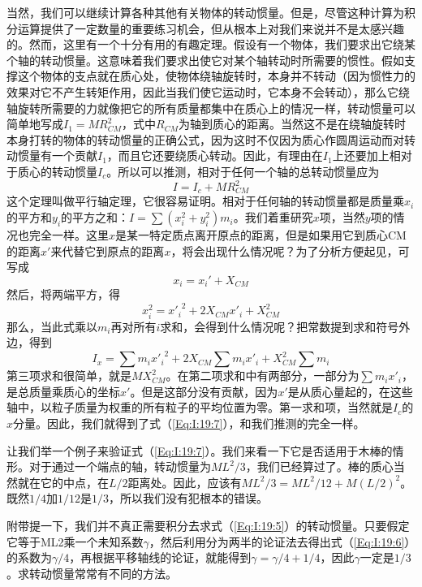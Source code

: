 当然，我们可以继续计算各种其他有关物体的转动惯量。但是，尽管这种计算为积分运算提供了一定数量的重要练习机会，但从根本上对我们来说并不是太感兴趣的。然而，这里有一个十分有用的有趣定理。假设有一个物体，我们要求出它绕某个轴的转动惯量。这意味着我们要求出使它对某个轴转动时所需要的惯性。假如支撑这个物体的支点就在质心处，使物体绕轴旋转时，本身并不转动（因为惯性力的效果对它不产生转矩作用，因此当我们使它运动时，它本身不会转动），那么它绕轴旋转所需要的力就像把它的所有质量都集中在质心上的情况一样，转动惯量可以简单地写成$I_1=MR^2_{CM}$，式中$R_{CM}$为轴到质心的距离。当然这不是在绕轴旋转时本身打转的物体的转动惯量的正确公式，因为这时不仅因为质心作圆周运动而对转动惯量有一个贡献$I_1$，而且它还要绕质心转动。因此，有理由在$I_1$上还要加上相对于质心的转动惯量$I_c$。所以可以推测，相对于任何一个轴的总转动惯量应为
\begin{equation}
    \label{Eq:I:19:7}
    I=I_c + MR_{CM}^2
\end{equation}
这个定理叫做平行轴定理，它很容易证明。相对于任何轴的转动惯量都是质量乘$x_i$的平方和$y_i$的平方之和：$I=\sum (x_i^2 + y_i^2)m_i$。我们着重研究$x$项，当然$y$项的情况也完全一样。这里$x$是某一特定质点离开原点的距离，但是如果用它到质心CM的距离$x'$来代替它到原点的距离$x$，将会出现什么情况呢？为了分析方便起见，可写成
\begin{equation*}
    x_i=x_i' + X_{CM}
\end{equation*}
然后，将两端平方，得
\begin{equation*}
    x_i^2={x'_i}^2 + 2X_{CM}x'_i + X_{CM}^2
\end{equation*}
那么，当此式乘以$m_i$再对所有$i$求和，会得到什么情况呢？把常数提到求和符号外边，得到
\begin{equation*}
    I_x = \sum m_i {x'_i}^2 + 2X_{CM} \sum m_i x'_i + X^2_{CM} \sum m_i
\end{equation*}
第三项求和很简单，就是$MX_{CM}^2$。在第二项求和中有两部分，一部分为$\sum m_ix'_i$，是总质量乘质心的坐标$x'$。但是这部分没有贡献，因为$x'$是从质心量起的，在这些轴中，以粒子质量为权重的所有粒子的平均位置为零。第一求和项，当然就是$I_c$的$x$分量。因此，我们就得到了式（\ref{Eq:I:19:7}），和我们推测的完全一样。

让我们举一个例子来验证式（\ref{Eq:I:19:7}）。我们来看一下它是否适用于木棒的情形。对于通过一个端点的轴，转动惯量为$ML^2/3$，我们已经算过了。棒的质心当然就在它的中点，在$L/2$距离处。因此，应该有$ML^2/3=ML^2/12+M(L/2)^2$。既然$1/4$加$1/12$是$1/3$，所以我们没有犯根本的错误。

附带提一下，我们并不真正需要积分去求式（\ref{Eq:I:19:5}）的转动惯量。只要假定它等于ML2乘一个未知系数$\gamma$，然后利用分为两半的论证法去得出式（\ref{Eq:I:19:6}）的系数为$\gamma/4$，再根据平移轴线的论证，就能得到$\gamma = \gamma /4+1/4$，因此$\gamma$一定是$1/3$。求转动惯量常常有不同的方法。

